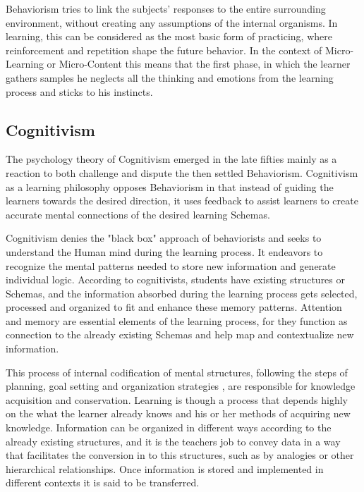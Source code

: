 Behaviorism tries to link the subjects' responses to the entire surrounding 
environment, without creating any assumptions of the internal organisms. In 
learning, this can be considered as the most basic form of practicing, where 
reinforcement and repetition shape the future behavior. In the context of 
Micro-Learning or Micro-Content this means that the first phase, in which the 
learner gathers samples he neglects all the thinking and emotions from the learning
process and sticks to his instincts.



\subsection{Cognitivism}

The psychology theory of Cognitivism emerged in the late fifties mainly as a 
reaction to both challenge and dispute the then settled Behaviorism.
Cognitivism as a learning philosophy opposes Behaviorism in that instead of 
guiding the learners towards the desired direction, it uses feedback to assist 
learners to create accurate mental connections of the desired learning Schemas.

Cognitivism denies the "black box" approach of behaviorists and seeks to understand
the Human mind during the learning process. It endeavors to recognize the mental 
patterns needed to store new information and generate individual logic.
According to cognitivists, students have existing structures or Schemas, and 
the information absorbed during the learning process gets selected, processed
and organized to fit and enhance these memory patterns. \cite{hursthouse_johnson_1980}
Attention and memory are essential elements of the learning process, for they 
function as connection to the already existing Schemas and help map and contextualize
new information. 

This process of internal codification of mental structures, following the steps
of planning, goal setting and organization strategies \cite{hursthouse_johnson_1980}, are
responsible for knowledge acquisition and conservation. Learning is though a 
process that depends highly on the what the learner already knows and his or her
methods of acquiring new knowledge. Information can be organized in different 
ways according to the already existing structures, and it is the teachers 
job to convey data in a way that facilitates the conversion in to this structures, 
such as by analogies or other hierarchical relationships. Once information is 
stored and implemented in different contexts it is said to be transferred. \cite{schunk_academic_motivation_1991}

